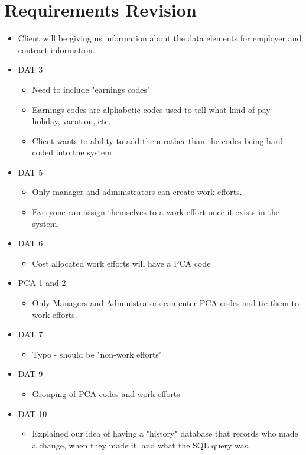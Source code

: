\documentclass{article}
\begin{document}
\section{Requirements Revision}
\begin{itemize}
\item Client will be giving us information about the data elements for employer and contract information.
\item DAT 3
	\begin{itemize}
	\item Need to include "earnings codes"
	\item Earnings codes are alphabetic codes used to tell what kind of pay - holiday, vacation, etc.
	\item Client wants to ability to add them rather than the codes being hard coded into the system
	\end{itemize}
\item DAT 5
	\begin{itemize}
	\item Only manager and administrators can create work efforts.
	\item Everyone can assign themselves to a work effort once it exists in the system.
	\end{itemize}
\item DAT 6
	\begin{itemize}
	\item Cost allocated work efforts will have a PCA code
	\end{itemize}
\item PCA 1 and 2
	\begin{itemize}
	\item Only Managers and Administrators can enter PCA codes and tie them to work efforts.
	\end{itemize}
\item DAT 7
	\begin{itemize}
	\item Typo - should be "non-work efforts"
	\end{itemize}
\item DAT 9
	\begin{itemize}
	\item Grouping of PCA codes and work efforts
	\end{itemize}
\item DAT 10
	\begin{itemize}
	\item Explained our idea of having a "history" database that records who made a change, when they made it, and what the SQL query was.

\end{itemize}
\end{itemize}
\end{document}
